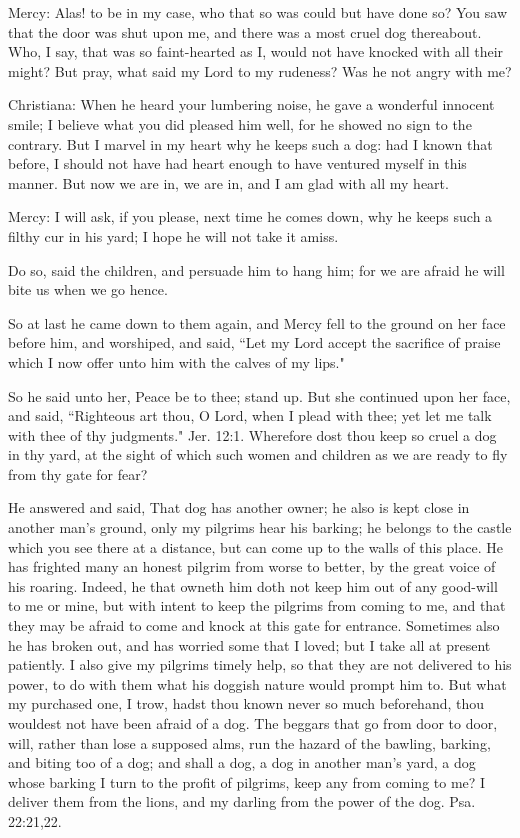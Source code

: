 Mercy: Alas! to be in my case, who that so was could but have done so? You saw that the door was shut upon me, and there was a most cruel dog thereabout. Who, I say, that was so faint-hearted as I, would not have knocked with all their might? But pray, what said my Lord to my rudeness? Was he not angry with me?

Christiana: When he heard your lumbering noise, he gave a wonderful innocent smile; I believe what you did pleased him well, for he showed no sign to the contrary. But I marvel in my heart why he keeps such a dog: had I known that before, I should not have had heart enough to have ventured myself in this manner. But now we are in, we are in, and I am glad with all my heart.

Mercy: I will ask, if you please, next time he comes down, why he keeps such a filthy cur in his yard; I hope he will not take it amiss.

Do so, said the children, and persuade him to hang him; for we are afraid he will bite us when we go hence.

So at last he came down to them again, and Mercy fell to the ground on her face before him, and worshiped, and said, ``Let my Lord accept the sacrifice of praise which I now offer unto him with the calves of my lips."

So he said unto her, Peace be to thee; stand up. But she continued upon her face, and said, ``Righteous art thou, O Lord, when I plead with thee; yet let me talk with thee of thy judgments." Jer. 12:1. Wherefore dost thou keep so cruel a dog in thy yard, at the sight of which such women and children as we are ready to fly from thy gate for fear?

He answered and said, That dog has another owner; he also is kept close in another man's ground, only my pilgrims hear his barking; he belongs to the castle which you see there at a distance, but can come up to the walls of this place. He has frighted many an honest pilgrim from worse to better, by the great voice of his roaring. Indeed, he that owneth him doth not keep him out of any good-will to me or mine, but with intent to keep the pilgrims from coming to me, and that they may be afraid to come and knock at this gate for entrance. Sometimes also he has broken out, and has worried some that I loved; but I take all at present patiently. I also give my pilgrims timely help, so that they are not delivered to his power, to do with them what his doggish nature would prompt him to. But what my purchased one, I trow, hadst thou known never so much beforehand, thou wouldest not have been afraid of a dog. The beggars that go from door to door, will, rather than lose a supposed alms, run the hazard of the bawling, barking, and biting too of a dog; and shall a dog, a dog in another man's yard, a dog whose barking I turn to the profit of pilgrims, keep any from coming to me? I deliver them from the lions, and my darling from the power of the dog. Psa. 22:21,22.

